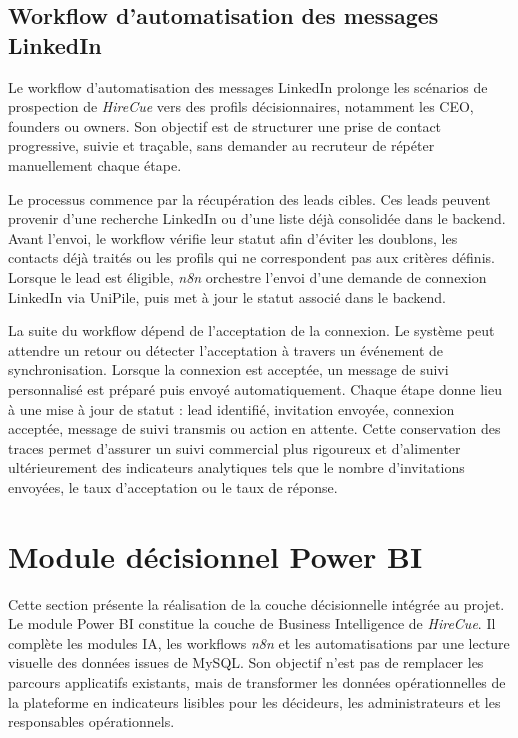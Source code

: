 \subsection{Workflow d'automatisation des messages LinkedIn}

Le workflow d'automatisation des messages LinkedIn prolonge les scénarios de prospection de \textit{HireCue} vers des profils décisionnaires, notamment les CEO, founders ou owners. Son objectif est de structurer une prise de contact progressive, suivie et traçable, sans demander au recruteur de répéter manuellement chaque étape.

Le processus commence par la récupération des leads cibles. Ces leads peuvent provenir d'une recherche LinkedIn ou d'une liste déjà consolidée dans le backend. Avant l'envoi, le workflow vérifie leur statut afin d'éviter les doublons, les contacts déjà traités ou les profils qui ne correspondent pas aux critères définis. Lorsque le lead est éligible, \textit{n8n} orchestre l'envoi d'une demande de connexion LinkedIn via UniPile, puis met à jour le statut associé dans le backend.

La suite du workflow dépend de l'acceptation de la connexion. Le système peut attendre un retour ou détecter l'acceptation à travers un événement de synchronisation. Lorsque la connexion est acceptée, un message de suivi personnalisé est préparé puis envoyé automatiquement. Chaque étape donne lieu à une mise à jour de statut : lead identifié, invitation envoyée, connexion acceptée, message de suivi transmis ou action en attente. Cette conservation des traces permet d'assurer un suivi commercial plus rigoureux et d'alimenter ultérieurement des indicateurs analytiques tels que le nombre d'invitations envoyées, le taux d'acceptation ou le taux de réponse.

\section{Module décisionnel Power BI}

Cette section présente la réalisation de la couche décisionnelle intégrée au projet. Le module Power BI \cite{powerbi_docs} constitue la couche de Business Intelligence de \textit{HireCue}. Il complète les modules IA, les workflows \textit{n8n} et les automatisations par une lecture visuelle des données issues de MySQL. Son objectif n'est pas de remplacer les parcours applicatifs existants, mais de transformer les données opérationnelles de la plateforme en indicateurs lisibles pour les décideurs, les administrateurs et les responsables opérationnels.

